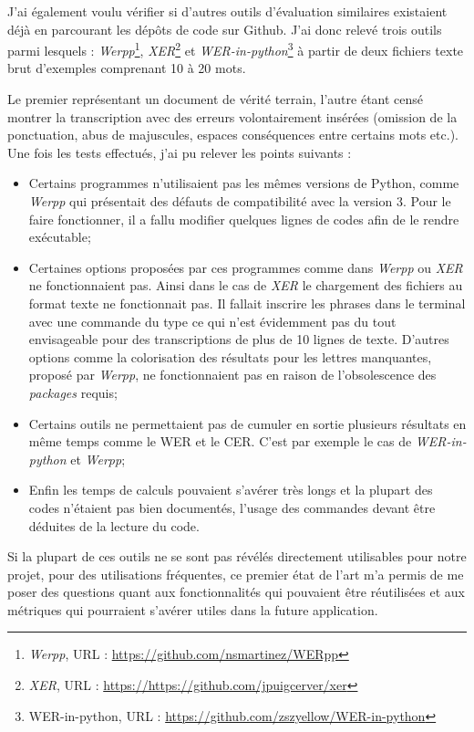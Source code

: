J'ai également voulu vérifier si d'autres outils d'évaluation similaires existaient déjà en parcourant les dépôts de code sur Github. J'ai donc relevé trois outils parmi lesquels :  \textit{Werpp}\footnote{\textit{Werpp}, URL : \url{https://github.com/nsmartinez/WERpp}}, \textit{XER}\footnote{\textit{XER}, URL : \url{https://https://github.com/jpuigcerver/xer}} et \textit{WER-in-python}\footnote{WER-in-python, URL : \url{https://github.com/zszyellow/WER-in-python}} à partir de deux fichiers texte brut d'exemples comprenant 10 à 20 mots. 

Le premier représentant un document de vérité terrain, l'autre étant censé montrer la transcription avec des erreurs volontairement insérées (omission de la ponctuation, abus de majuscules, espaces conséquences entre certains mots etc.).\\
\newpage
Une fois les tests effectués, j'ai pu relever les points suivants :
\begin{itemize}
    \item Certains programmes n'utilisaient pas les mêmes versions de Python, comme \textit{Werpp} qui présentait des défauts de compatibilité avec la version 3. Pour le faire fonctionner, il a fallu modifier quelques lignes de codes afin de le rendre exécutable;
    \item Certaines options proposées par ces programmes comme dans \textit{Werpp} ou \textit{XER} ne fonctionnaient pas. Ainsi dans le cas de \textit{XER} le chargement des fichiers au format texte ne fonctionnait pas. Il fallait inscrire les phrases dans le terminal avec une commande du type  ce qui n'est évidemment pas du tout envisageable pour des transcriptions de plus de 10 lignes de texte. D'autres options comme la colorisation des résultats pour les lettres manquantes, proposé par \textit{Werpp}, ne fonctionnaient pas en raison de l'obsolescence des \textit{packages} requis;
    \item Certains outils ne permettaient pas de cumuler en sortie plusieurs résultats en même temps comme le WER et le CER. C'est par exemple le cas de \textit{WER-in-python} et \textit{Werpp};
    \item Enfin les temps de calculs pouvaient s'avérer très longs et la plupart des codes n'étaient pas bien documentés, l'usage des commandes devant être déduites de la lecture du code.\\
\end{itemize}
\medskip
Si la plupart de ces outils ne se sont pas révélés directement utilisables pour notre projet, pour des utilisations fréquentes, ce premier état de l'art m'a permis de me poser des questions quant aux fonctionnalités qui pouvaient être réutilisées et aux métriques qui pourraient s'avérer utiles dans la future application. 

